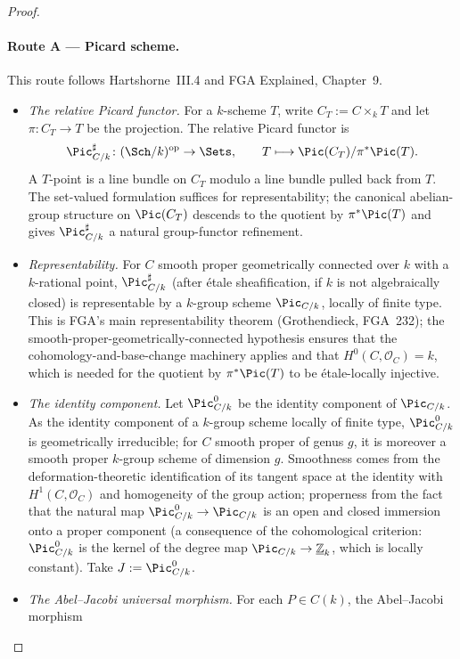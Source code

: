 \begin{proof}
  \paragraph{Route A --- Picard scheme.}
  This route follows Hartshorne~III.4 and FGA Explained, Chapter~9.
  \begin{itemize}
    \item[\textbf{(A.1)}] \emph{The relative Picard functor.} For a \(k\)-scheme \(T\), write \(C_T := C \times_k T\) and let \(\pi \colon C_T \to T\) be the projection. The relative Picard functor is
    \[
      \Pic^{\sharp}_{C/k} \colon (\Sch/k)^{\mathrm{op}} \to \Sets, \qquad
      T \longmapsto \Pic(C_T) / \pi^*\Pic(T).
    \]
    A \(T\)-point is a line bundle on \(C_T\) modulo a line bundle pulled back from \(T\). The set-valued formulation suffices for representability; the canonical abelian-group structure on \(\Pic(C_T)\) descends to the quotient by \(\pi^*\Pic(T)\) and gives \(\Pic^{\sharp}_{C/k}\) a natural group-functor refinement.
    \item[\textbf{(A.2)}] \emph{Representability.} For \(C\) smooth proper geometrically connected over \(k\) with a \(k\)-rational point, \(\Pic^{\sharp}_{C/k}\) (after \'etale sheafification, if \(k\) is not algebraically closed) is representable by a \(k\)-group scheme \(\Pic_{C/k}\), locally of finite type. This is FGA's main representability theorem (Grothendieck, FGA~232); the smooth-proper-geometrically-connected hypothesis ensures that the cohomology-and-base-change machinery applies and that \(H^0(C, \mathcal O_C) = k\), which is needed for the quotient by \(\pi^*\Pic(T)\) to be \'etale-locally injective.
    \item[\textbf{(A.3)}] \emph{The identity component.} Let \(\Pic^0_{C/k}\) be the identity component of \(\Pic_{C/k}\). As the identity component of a \(k\)-group scheme locally of finite type, \(\Pic^0_{C/k}\) is geometrically irreducible; for \(C\) smooth proper of genus \(g\), it is moreover a smooth proper \(k\)-group scheme of dimension \(g\). Smoothness comes from the deformation-theoretic identification of its tangent space at the identity with \(H^1(C, \mathcal O_C)\) and homogeneity of the group action; properness from the fact that the natural map \(\Pic^0_{C/k} \to \Pic_{C/k}\) is an open and closed immersion onto a proper component (a consequence of the cohomological criterion: \(\Pic^0_{C/k}\) is the kernel of the degree map \(\Pic_{C/k} \to \underline{\mathbb Z}_k\), which is locally constant). Take \(J := \Pic^0_{C/k}\).
    \item[\textbf{(A.4)}] \emph{The Abel--Jacobi universal morphism.} For each \(P \in C(k)\), the Abel--Jacobi morphism

\end{itemize}
\end{proof}
